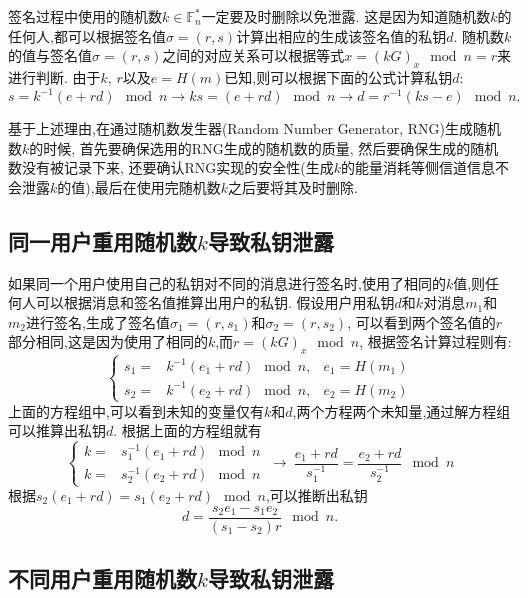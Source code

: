 \documentclass{article}
\newcommand{\F}{\mathbb{F}}
\begin{document}
签名过程中使用的随机数$k\in\F_n^*$一定要及时删除以免泄露.
这是因为知道随机数$k$的任何人,都可以根据签名值$\sigma=(r,s)$计算出相应的生成该签名值的私钥$d$.
随机数$k$的值与签名值$\sigma=(r,s)$之间的对应关系可以根据等式$x = (kG)_x \mod n = r$来进行判断.
由于$k$, $r$以及$e=H(m)$已知,则可以根据下面的公式计算私钥$d$:
$$s=k^{-1}(e+rd) \mod n \rightarrow ks = (e + rd)\mod n \rightarrow d = r^{-1}(ks - e)\mod n.$$

基于上述理由,在通过随机数发生器(Random Number Generator, RNG)生成随机数$k$的时候,
首先要确保选用的RNG生成的随机数的质量, 然后要确保生成的随机数没有被记录下来, 
还要确认RNG实现的安全性(生成$k$的能量消耗等侧信道信息不会泄露$k$的值),最后在使用完随机数$k$之后要将其及时删除.

\subsection{同一用户重用随机数$k$导致私钥泄露\label{subsec-1usereusek}}

如果同一个用户使用自己的私钥对不同的消息进行签名时,使用了相同的$k$值,则任何人可以根据消息和签名值推算出用户的私钥.
假设用户用私钥$d$和$k$对消息$m_1$和$m_2$进行签名,生成了签名值$\sigma_1=(r, s_1)$和$\sigma_2=(r, s_2)$,
可以看到两个签名值的$r$部分相同,这是因为使用了相同的$k$,而$r = (kG)_x \mod n$, 根据签名计算过程则有:
\begin{equation}\nonumber
\left\{
\begin{array}{lll}
s_1 = & k^{-1}(e_1 + rd) \mod n, & e_1 = H(m_1)\\
s_2 = & k^{-1}(e_2 + rd) \mod n, & e_2 = H(m_2)
\end{array}
\right.
\end{equation}
上面的方程组中,可以看到未知的变量仅有$k$和$d$,两个方程两个未知量,通过解方程组可以推算出私钥$d$.
根据上面的方程组就有
\begin{equation}\nonumber
\left\{
\begin{array}{ll}
k = & s_1^{-1} (e_1 + rd) \mod n \\
k = & s_2^{-1} (e_2 + rd) \mod n
\end{array}
\right.
\ 
\rightarrow
\ 
\dfrac{e_1+rd}{s_1^{-1}} = \dfrac{e_2+rd}{s_2^{-1}} \mod n
\end{equation}
根据$s_2(e_1+rd) = s_1(e_2+rd)\mod n$,可以推断出私钥
$$d = \dfrac{s_2e_1 - s_1e_2}{(s_1-s_2)r} \mod n.$$

\subsection{不同用户重用随机数$k$导致私钥泄露\label{subsec-2usereusek}}
\end{document}
